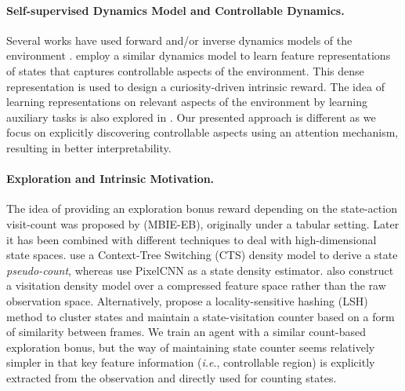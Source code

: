 \documentclass{article} \usepackage{iclr,times}
\makeatletter
\DeclareRobustCommand\onedot{\futurelet\@let@token\@onedot}
\def\onedot{.}
\def\ie{\emph{i.e}\onedot} \def\Ie{\emph{I.e}\onedot}
\makeatother
\begin{document}
\vspace*{-10pt}
\paragraph{Self-supervised Dynamics Model and Controllable Dynamics.}


Several works have used forward and/or inverse dynamics models of the environment \citep{Oh:NIPS2015:ActionVideoPred,Agrawal:2016,Shelhamer:2017}. \cite{Pathak:ICML2017:Curiosity}
employ a similar dynamics model to learn feature representations of states that captures controllable aspects of the environment.
This dense representation is used to design a curiosity-driven intrinsic reward.
The idea of learning representations on relevant aspects of the environment
by learning auxiliary tasks is also explored
in \citep{Jaderberg:ICLR2017:RLAux,Bengio:2017:FeatureControl,Sawada:2018:Controllable}.
Our presented approach is different as we focus on explicitly discovering controllable aspects using an attention mechanism, resulting in better interpretability.








\vspace*{-10pt}
\paragraph{Exploration and Intrinsic Motivation.}

The idea of providing an exploration bonus reward depending on the state-action visit-count was proposed by \cite{Strehl:2008} (MBIE-EB),
originally under a tabular setting.
Later it has been combined with different techniques to deal with high-dimensional state spaces. \cite{Bellemare:NIPS2016:UnifyingCount} use a Context-Tree Switching (CTS) density model
to derive a state \emph{pseudo-count},
whereas
\cite{Ostrovski:ICML2017:ExplorationDensity} use PixelCNN as a state density estimator.
\cite{Martin:1706.08090} also construct a visitation density model over a compressed feature space
rather than the raw observation space.
Alternatively,
\cite{Tang:NIPS2017:SimHash} propose a locality-sensitive hashing (LSH) method to cluster states
and maintain a state-visitation counter based on a form of similarity between frames.
We train an agent with a similar count-based exploration bonus,
but the way of maintaining state counter seems relatively simpler
in that key feature information (\ie, controllable region) is explicitly extracted from the observation and directly used for counting states.
\end{document}
